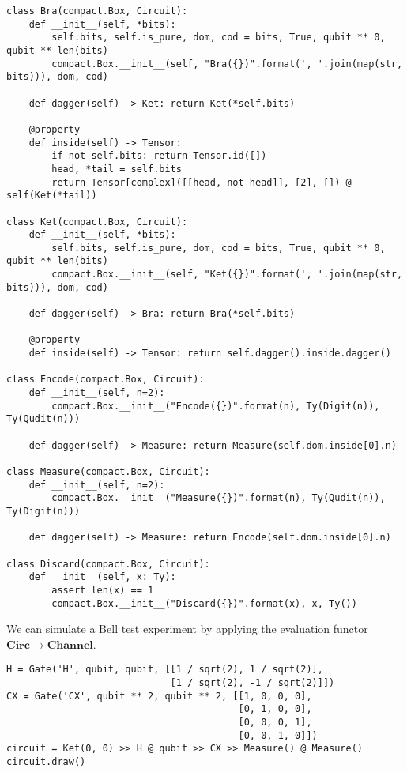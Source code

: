 \begin{python}
\begin{verbatim}
class Bra(compact.Box, Circuit):
    def __init__(self, *bits):
        self.bits, self.is_pure, dom, cod = bits, True, qubit ** 0, qubit ** len(bits)
        compact.Box.__init__(self, "Bra({})".format(', '.join(map(str, bits))), dom, cod)

    def dagger(self) -> Ket: return Ket(*self.bits)

    @property
    def inside(self) -> Tensor:
        if not self.bits: return Tensor.id([])
        head, *tail = self.bits
        return Tensor[complex]([[head, not head]], [2], []) @ self(Ket(*tail))

class Ket(compact.Box, Circuit):
    def __init__(self, *bits):
        self.bits, self.is_pure, dom, cod = bits, True, qubit ** 0, qubit ** len(bits)
        compact.Box.__init__(self, "Ket({})".format(', '.join(map(str, bits))), dom, cod)

    def dagger(self) -> Bra: return Bra(*self.bits)

    @property
    def inside(self) -> Tensor: return self.dagger().inside.dagger()

class Encode(compact.Box, Circuit):
    def __init__(self, n=2):
        compact.Box.__init__("Encode({})".format(n), Ty(Digit(n)), Ty(Qudit(n)))

    def dagger(self) -> Measure: return Measure(self.dom.inside[0].n)

class Measure(compact.Box, Circuit):
    def __init__(self, n=2):
        compact.Box.__init__("Measure({})".format(n), Ty(Qudit(n)), Ty(Digit(n)))

    def dagger(self) -> Measure: return Encode(self.dom.inside[0].n)

class Discard(compact.Box, Circuit):
    def __init__(self, x: Ty):
        assert len(x) == 1
        compact.Box.__init__("Discard({})".format(x), x, Ty())
\end{verbatim}
\end{python}

\begin{example}
We can simulate a Bell test experiment by applying the evaluation functor $\mathbf{Circ} \to \mathbf{Channel}$.

\begin{verbatim}
H = Gate('H', qubit, qubit, [[1 / sqrt(2), 1 / sqrt(2)],
                             [1 / sqrt(2), -1 / sqrt(2)]])
CX = Gate('CX', qubit ** 2, qubit ** 2, [[1, 0, 0, 0],
                                         [0, 1, 0, 0],
                                         [0, 0, 0, 1],
                                         [0, 0, 1, 0]])
circuit = Ket(0, 0) >> H @ qubit >> CX >> Measure() @ Measure()
circuit.draw()
\end{verbatim}


\end{example}
